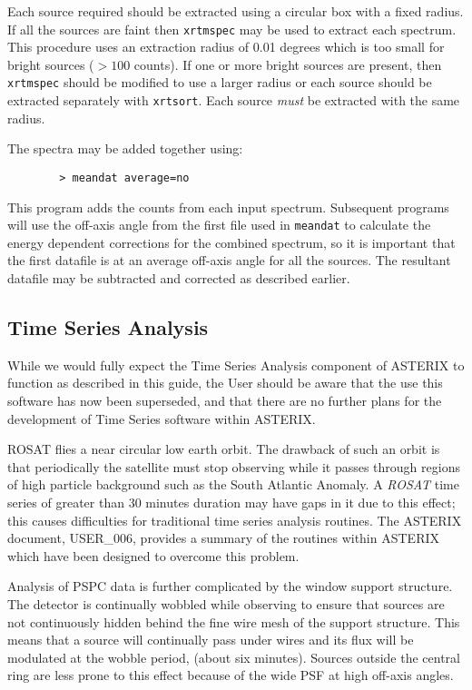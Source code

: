\documentclass[11pt,fleqn]{article}    %
\begin{document}
Each source required should be extracted using a circular box with a
fixed radius. If all the sources are faint then {\tt xrtmspec} may be used
to extract each spectrum. This procedure uses an extraction radius of
0.01 degrees which is too small for bright sources ($>100$ counts). If
one or more bright sources are present, then {\tt xrtmspec} should be modified
to use a larger radius or each source should be extracted separately with
{\tt xrtsort}. Each source {\em must} be extracted with the same radius.

The spectra may be added together using:

\begin{verbatim}
        > meandat average=no
\end{verbatim}

This program adds the counts from each input spectrum. 
Subsequent programs will use the
off-axis angle from the first file used in {\tt meandat} to calculate the 
energy dependent corrections for the combined spectrum, so it is 
important that the first datafile is at an average 
off-axis angle for all the sources.
The resultant datafile may be subtracted and corrected as described earlier.

\subsection{Time Series Analysis}

While we would  fully expect the Time Series  Analysis component of ASTERIX
to function as described in this guide, the User should  be aware that 
the use this software has now been superseded, and that there are
no further plans for the development of Time Series software within ASTERIX.

ROSAT flies a near circular low earth orbit. The drawback of
such an orbit is that periodically the satellite must stop observing while
it passes through regions of high particle background such as the South 
Atlantic Anomaly. A {\em ROSAT} time series of greater than 30 minutes duration 
may have gaps in it due to this effect; this causes     difficulties for
traditional time series analysis routines. The ASTERIX document, USER\_006, 
provides a summary of the routines within ASTERIX which have
been designed to overcome this problem.

Analysis of PSPC data is further complicated by the window support
structure. The detector is continually wobbled while observing 
to ensure that sources are not continuously hidden behind the 
fine wire mesh of the 
support structure. This means that a source will continually pass under 
wires and its flux will be modulated at the wobble period, (about 
six minutes). Sources outside the central ring are less prone to this effect
because of the wide PSF at high off-axis angles. 
\end{document}
